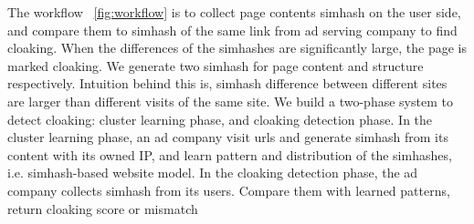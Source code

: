 The workflow ~\autoref{fig:workflow} is to collect page contents simhash on the user side, and compare
them to simhash of the same link from ad serving company to find cloaking. When
the differences of the simhashes are significantly large, the page is marked
cloaking. We generate two simhash for page content and structure respectively.
Intuition behind this is, simhash difference between different sites are larger
than different visits of the same site. We build a two-phase system to detect
cloaking: cluster learning phase, and cloaking detection phase. In the cluster
learning phase, an ad company visit urls and generate simhash from its content
with its owned IP, and learn pattern and distribution of the simhashes, i.e.
simhash-based website model. In the cloaking detection phase, the ad company
collects simhash from its users. Compare them with learned patterns, return
cloaking score or mismatch


